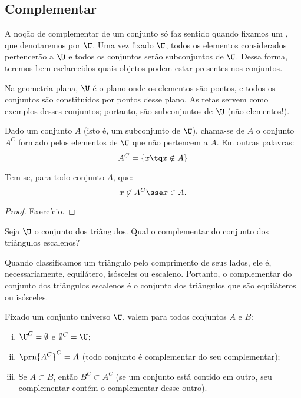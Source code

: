 \subsection{Complementar}
A noção de complementar de um conjunto só faz sentido quando fixamos um , que denotaremos por $\U$.
Uma vez fixado $\U$, todos os elementos considerados pertencerão a $\U$ e todos os conjuntos serão subconjuntos de $\U$.
Dessa forma, teremos bem esclarecidos quais objetos podem estar presentes nos conjuntos.

\begin{example}
Na geometria plana, $\U$ é o plano onde os elementos são pontos, e todos os conjuntos são constituídos por pontos desse plano. As retas servem como exemplos desses conjuntos; portanto, são subconjuntos de $\U$ (não elementos!).
\end{example}

\begin{definition}[Complementar]
\label{def:complementar}
Dado um conjunto $A$ (isto é, um subconjunto de $\U$), chama-se  de $A$ o conjunto $A^C$ formado pelos elementos de $\U$ que não pertencem a $A$.
Em outras palavras:
$$
A^C = \{x \tq x \notin A\}
$$
\end{definition}

\begin{proposition}
\label{prop:def-complementar}
Tem-se, para todo conjunto $A$, que:
$$
x \not \in A^C \sse x \in A.
$$
\end{proposition}

\begin{proof}
Exercício.
\end{proof}

\begin{example}
Seja $\U$ o conjunto dos triângulos.
Qual o complementar do conjunto dos triângulos escalenos?
\end{example}

\begin{solution}
	Quando classificamos um triângulo pelo comprimento de seus lados, ele é, necessariamente, equilátero, isósceles ou escaleno. Portanto, o complementar do conjunto dos triângulos escalenos é o conjunto dos triângulos que são equiláteros ou isósceles.
\end{solution}

\begin{proposition}
\label{prop:complementar}
Fixado um conjunto universo $\U$, valem para todos conjuntos $A$ e $B$:
\begin{enumerate}[i)]
	\item
		\label{prop:complementar:universo}
		$\U^C=\emptyset$ e $\emptyset^C = \U$;
	\item
		\label{prop:complementar:complementar-do-complementar}
		$\prn{A^C}^C=A$ (todo conjunto é complementar do seu complementar);
	\item
		\label{prop:complementar:contrapositiva}
		Se $A \subset B$, então $B^C \subset A^C$ (se um conjunto está contido em outro, seu complementar contém o complementar desse outro). 
\end{enumerate}
\end{proposition}

